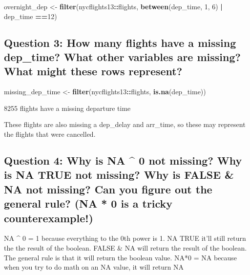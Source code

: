 \documentclass[
]{book}
\newenvironment{Shaded}{\begin{snugshade}}{\end{snugshade}}
\newcommand{\DecValTok}[1]{\textcolor[rgb]{0.00,0.00,0.81}{#1}}
\newcommand{\KeywordTok}[1]{\textcolor[rgb]{0.13,0.29,0.53}{\textbf{#1}}}
\newcommand{\NormalTok}[1]{#1}
\newcommand{\OperatorTok}[1]{\textcolor[rgb]{0.81,0.36,0.00}{\textbf{#1}}}
\newcommand{\StringTok}[1]{\textcolor[rgb]{0.31,0.60,0.02}{#1}}
\begin{document}
\begin{Shaded}
\begin{Highlighting}[]
\NormalTok{overnight_dep <-}\StringTok{ }\KeywordTok{filter}\NormalTok{(nycflights13}\OperatorTok{::}\NormalTok{flights, }\KeywordTok{between}\NormalTok{(dep_time, }\DecValTok{1}\NormalTok{, }\DecValTok{6}\NormalTok{) }\OperatorTok{|}\StringTok{ }\NormalTok{dep_time }\OperatorTok{==}\DecValTok{12}\NormalTok{)}
\end{Highlighting}
\end{Shaded}

\hypertarget{question-3-how-many-flights-have-a-missing-dep_time-what-other-variables-are-missing-what-might-these-rows-represent}{%
\subsection{Question 3: How many flights have a missing dep\_time? What other variables are missing? What might these rows represent?}\label{question-3-how-many-flights-have-a-missing-dep_time-what-other-variables-are-missing-what-might-these-rows-represent}}

\begin{Shaded}
\begin{Highlighting}[]
\NormalTok{missing_dep_time <-}\StringTok{ }\KeywordTok{filter}\NormalTok{(nycflights13}\OperatorTok{::}\NormalTok{flights, }\KeywordTok{is.na}\NormalTok{(dep_time))}
\end{Highlighting}
\end{Shaded}

8255 flights have a missing departure time

These flights are also missing a dep\_delay and arr\_time, so these may represent the flights that were cancelled.

\hypertarget{question-4-why-is-na-0-not-missing-why-is-na-true-not-missing-why-is-false-na-not-missing-can-you-figure-out-the-general-rule-na-0-is-a-tricky-counterexample}{%
\subsection{Question 4: Why is NA \^{} 0 not missing? Why is NA \textbar{} TRUE not missing? Why is FALSE \& NA not missing? Can you figure out the general rule? (NA * 0 is a tricky counterexample!)}\label{question-4-why-is-na-0-not-missing-why-is-na-true-not-missing-why-is-false-na-not-missing-can-you-figure-out-the-general-rule-na-0-is-a-tricky-counterexample}}

NA \^{} 0 = 1 because everything to the 0th power is 1.
NA \textbar{} TRUE it'll still return the the result of the boolean.
FALSE \& NA will return the result of the boolean.
The general rule is that it will return the boolean value.
NA*0 = NA because when you try to do math on an NA value, it will return NA
\end{document}
